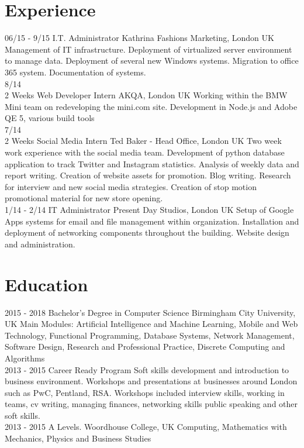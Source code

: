 \documentclass[]{friggeri-cv}
\begin{document}
\section{Experience}
\begin{entrylist}
  \entry
    {06/15 - 9/15}
    {I.T. Administrator}
    {Kathrina Fashions Marketing, London UK}
    {Management of IT infrastructure.
Deployment of virtualized server environment to manage data.
Deployment of several new Windows systems.
Migration to office 365 system.
Documentation of systems.\\}
  \entry
    {8/14  \\2 Weeks   }
    {Web Developer Intern}
    {AKQA, London UK}
    {Working within the BMW Mini team on redeveloping the mini.com site.
Development in Node.js and Adobe QE 5, various build tools\\}
    \entry
    {7/14 \\2 Weeks}
    {Social Media Intern}
    {Ted Baker - Head Office, London UK}
    {Two week work experience with the social media team. 
Development of python database application to track Twitter and Instagram statistics.
Analysis of weekly data and report writing.
Creation of website assets for promotion.
Blog writing.
Research for interview and new social media strategies.
Creation of stop motion promotional material for new store opening.\\}
    \entry
    {1/14 - 2/14}
    {IT Administrator}
    {Present Day Studios, London UK}
 {Setup of Google Apps systems for email and file management within organization.
Installation and deployment of networking components throughout the building.
Website design and administration.\\}
\end{entrylist}

\section{Education}
\begin{entrylist}
  \entry
    {2015 - 2018}
    {Bachelor's Degree in Computer Science}
    {Birmingham City University, UK}
    {Main Modules: Artificial Intelligence and Machine Learning, Mobile and Web Technology, Functional Programming, Database Systems, Network Management, Software Design, Research and Professional Practice, Discrete Computing and Algorithms\\}
  \entry
    {2013 - 2015}
    {Career Ready Program}
    {}
    {Soft skills development and introduction to business environment.
Workshops and presentations at businesses around London such as PwC, Pentland, RSA.
Workshops included interview skills, working in teams, cv writing, managing finances, networking skills public speaking and other soft skills.\\}
  \entry
    {2013 - 2015}
    {A Levels.}
    {Woordhouse College, UK}
    {Computing, Mathematics with Mechanics, Physics and Business Studies}
\end{entrylist}
\end{document}
